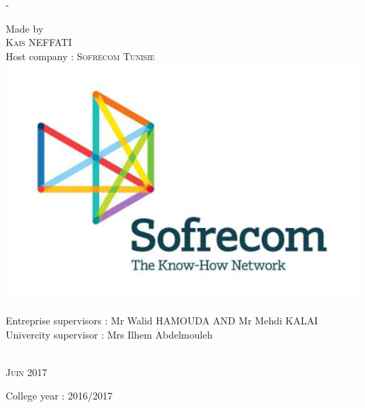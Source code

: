 \begin{titlingpage}
\begin{SingleSpace}
\begin{adjustwidth*}{\unitlength}{-\unitlength}
\begin{center}
\vspace{6.5mm}
{\normalsize Made by}\\
\vspace{5mm}
{\large\textsc{Kais NEFFATI}}\\
\vspace{10mm}
{\large Host company : \textsc{Sofrecom Tunisie}}\\
\vspace{5mm}
\includegraphics[scale=0.2]{logos/logo-sofrecom}\\
\vspace{10mm}
\begin{minipage}{15cm}
\begin{center}
{\small Entreprise supervisors : Mr Walid HAMOUDA AND Mr Mehdi KALAI }\\
\vspace{3mm}
{\small Univercity supervisor : Mrs Ilhem Abdelmouleh  }\\
\end{center}
\end{minipage}\\
\vspace{8mm}
{\large\textsc{Juin 2017}}\\
\vspace{8mm}
\end{center}
\begin{flushright}
{\small College year : 2016/2017}
\end{flushright}
\end{adjustwidth*}
\end{SingleSpace}
\end{titlingpage}